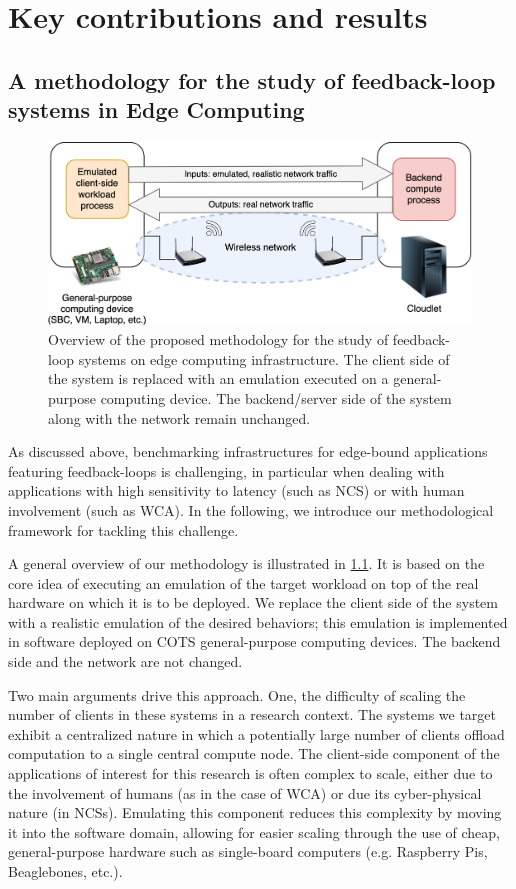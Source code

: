 \chapter{Key contributions and results}\label{chap:contributions}

\section{A methodology for the study of feedback-loop systems in Edge Computing}\label{summary:methodology}

\begin{figure}
    \centering
    \includegraphics[width=.8\textwidth]{Figs/methodology.png}
    \caption{%
        Overview of the proposed methodology for the study of feedback-loop systems on edge computing infrastructure.
        The  client side of the system is replaced with an emulation executed on a general-purpose computing device.
        The backend/server side of the system along with the network remain unchanged.
    }\label{fig:methodology}
\end{figure}

As discussed above, benchmarking infrastructures for edge-bound applications featuring feedback-loops is challenging, in particular when dealing with applications with high sensitivity to latency (such as \ac{NCS}) or with human involvement (such as \ac{WCA}).
In the following, we introduce our methodological framework for tackling this challenge.

A general overview of our methodology is illustrated in \cref{fig:methodology}.
It is based on the core idea of executing an emulation of the target workload on top of the real hardware on which it is to be deployed.
We replace the client side of the system with a realistic emulation of the desired behaviors; this emulation is implemented in software deployed on \ac{COTS} general-purpose computing devices.
The backend side and the network are not changed.

Two main arguments drive this approach.
One, the difficulty of scaling the number of clients in these systems in a research context.
The systems we target exhibit a centralized nature in which a potentially large number of clients offload computation to a single central compute node.
The client-side component of the applications of interest for this research is often complex to scale, either due to the involvement of humans (as in the case of \ac{WCA}) or due its cyber-physical nature (in \acp{NCS}).
Emulating this component reduces this complexity by moving it into the software domain, allowing for easier scaling through the use of cheap, general-purpose hardware such as single-board computers (e.g. Raspberry Pis, Beaglebones, etc.).

